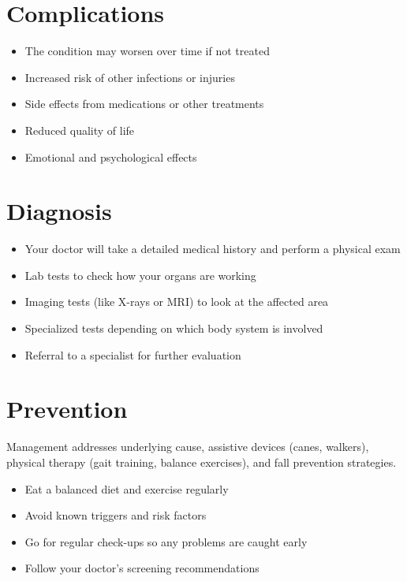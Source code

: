 \section{Complications}

\begin{itemize}[noitemsep]
  \item The condition may worsen over time if not treated
  \item Increased risk of other infections or injuries
  \item Side effects from medications or other treatments
  \item Reduced quality of life
  \item Emotional and psychological effects
\end{itemize}

\section{Diagnosis}

\begin{itemize}[noitemsep]
  \item Your doctor will take a detailed medical history and perform a physical exam
  \item Lab tests to check how your organs are working
  \item Imaging tests (like X-rays or MRI) to look at the affected area
  \item Specialized tests depending on which body system is involved
  \item Referral to a specialist for further evaluation
\end{itemize}

\section{Prevention}
Management addresses underlying cause, assistive devices (canes, walkers), physical therapy (gait training, balance exercises), and fall prevention strategies.

\begin{itemize}[noitemsep]
  \item Eat a balanced diet and exercise regularly
  \item Avoid known triggers and risk factors
  \item Go for regular check-ups so any problems are caught early
  \item Follow your doctor's screening recommendations
\end{itemize}

